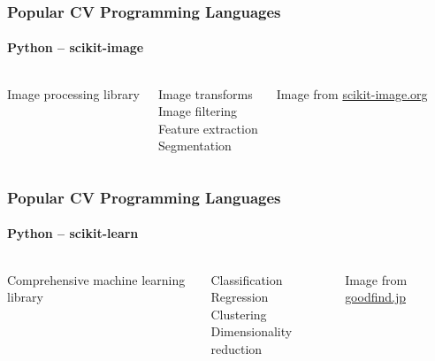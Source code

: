 \documentclass[xetex,professionalfont]{beamer}
\begin{document}

\begin{frame}
\frametitle{Popular CV Programming Languages}
\framesubtitle{Python -- scikit-image}

\begin{columns}

Image processing library

\medskip
Image transforms\\
Image filtering\\
Feature extraction\\
Segmentation %


\begin{center}
{
	{\centering Image from \url{scikit-image.org}}}
\end{center}

\end{columns}

\end{frame}


\begin{frame}
\frametitle{Popular CV Programming Languages}
\framesubtitle{Python -- scikit-learn}

\begin{columns}

Comprehensive machine learning library

\medskip
Classification\\
Regression\\
Clustering\\
Dimensionality reduction


\begin{center}
{
	{\centering Image from \url{goodfind.jp}}}
\end{center}

\end{columns}

\end{frame}
\end{document}
